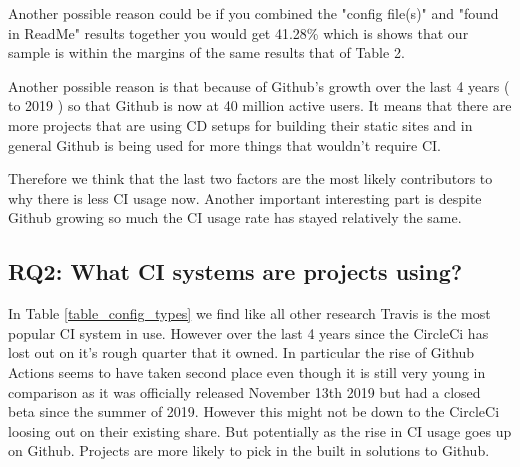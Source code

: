 \documentclass[twoside,12pt,titlepage,a4paper]{article}
\begin{document}
Another possible reason could be if you combined the "config file(s)" and "found in ReadMe" results together you would get 41.28\% which is shows that our sample is within the margins of the same results that of Table 2.

Another possible reason is that because of Github's growth over the last 4 years (\citet{GithubOctoverseResults2016} to 2019 \citet{GithubOctoverseResults}) so that Github is now at 40 million active users. It means that there are more projects that are using CD setups for building their static sites and in general Github is being used for more things that wouldn't require CI.

Therefore we think that the last two factors are the most likely contributors to why there is less CI usage now. Another important interesting part is despite Github growing so much the CI usage rate has stayed relatively the same. 





\vspace*{-0.05in}
\subsection{\textbf{RQ2}: What CI systems are projects using?}
\label{section:RQ2}
\vspace*{-0.05in}
In Table \ref{table_config_types} we find like all other research Travis is the most popular CI system in use. However over the last 4 years since the \cite{Github2017} CircleCi has lost out on it's rough quarter that it owned. In particular the rise of Github Actions seems to have taken second place even though it is still very young in comparison as it was officially released November 13th 2019 but had a closed beta since the summer of 2019. However this might not be down to the CircleCi loosing out on their existing share. But potentially as the rise in CI usage goes up on Github. Projects are more likely to pick in the built in solutions to Github.

\end{document}
